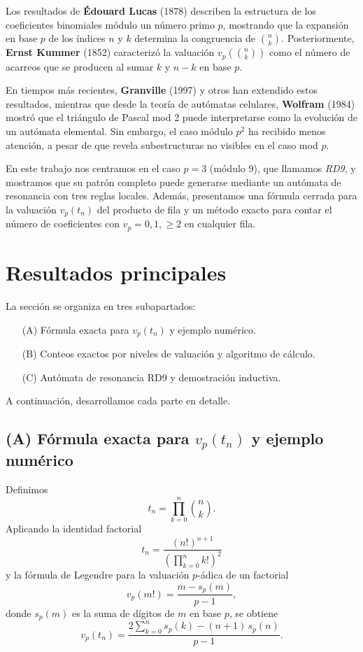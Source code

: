 \documentclass[12pt]{article}
\begin{document}
Los resultados de \textbf{Édouard Lucas} (1878) describen la estructura de los coeficientes binomiales módulo un número primo $p$, mostrando que la expansión en base $p$ de los índices $n$ y $k$ determina la congruencia de $\binom{n}{k}$. Posteriormente, \textbf{Ernst Kummer} (1852) caracterizó la valuación $v_p\!\left( \binom{n}{k} \right)$ como el número de acarreos que se producen al sumar $k$ y $n-k$ en base $p$.

En tiempos más recientes, \textbf{Granville} (1997) y otros han extendido estos resultados, mientras que desde la teoría de autómatas celulares, \textbf{Wolfram} (1984) mostró que el triángulo de Pascal mod 2 puede interpretarse como la evolución de un autómata elemental. Sin embargo, el caso módulo $p^2$ ha recibido menos atención, a pesar de que revela subestructuras no visibles en el caso mod $p$.

En este trabajo nos centramos en el caso $p=3$ (módulo $9$), que llamamos \emph{RD9}, y mostramos que su patrón completo puede generarse mediante un autómata de resonancia con tres reglas locales. Además, presentamos una fórmula cerrada para la valuación $v_p(t_n)$ del producto de fila y un método exacto para contar el número de coeficientes con $v_p=0,1,\ge 2$ en cualquier fila.

\section{Resultados principales}

La sección se organiza en tres subapartados:

\begin{itemize}
    \item[(A)] Fórmula exacta para $v_p(t_n)$ y ejemplo numérico.
    \item[(B)] Conteos exactos por niveles de valuación y algoritmo de cálculo.
    \item[(C)] Autómata de resonancia RD9 y demostración inductiva.
\end{itemize}

A continuación, desarrollamos cada parte en detalle.

\subsection*{(A) Fórmula exacta para $v_p(t_n)$ y ejemplo numérico}

Definimos
\[
t_n = \prod_{k=0}^n \binom{n}{k}.
\]
Aplicando la identidad factorial
\[
t_n = \frac{(n!)^{n+1}}{\left(\prod_{k=0}^n k!\right)^2}
\]
y la fórmula de Legendre para la valuación $p$-ádica de un factorial
\[
v_p(m!) = \frac{m - s_p(m)}{p-1},
\]
donde $s_p(m)$ es la suma de dígitos de $m$ en base $p$, se obtiene
\begin{equation}
v_p(t_n) = \frac{2\sum_{k=0}^n s_p(k) - (n+1)\, s_p(n)}{p-1}.
\label{eq:vp-formula}
\end{equation}
\end{document}
